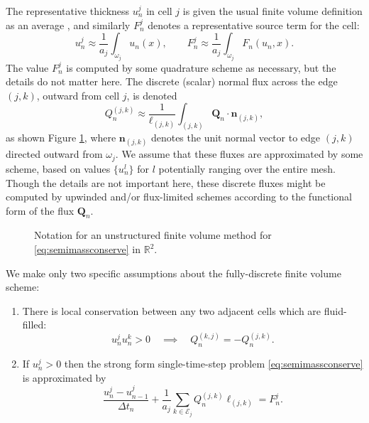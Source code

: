 \documentclass[final,leqno,onefignum,onetabnum]{siamltex1213bueler}
\newcommand\bn{\mathbf{n}}
\newcommand\bQ{\mathbf{Q}}
\newcommand\RR{\mathbb{R}}
\begin{document}
The representative thickness $u_n^j$ in cell $j$ is given the usual finite volume definition as an average \cite{LeVeque2002}, and similarly $F_n^j$ denotes a representative source term for the cell:
\begin{equation}
u_n^j \approx \frac{1}{a_j} \int_{\omega_j} u_n(x), \qquad F_n^j \approx \frac{1}{a_j} \int_{\omega_j} F_n(u_n,x).  \label{eq:fvthickness}
\end{equation}
The value $F_n^j$ is computed by some quadrature scheme as necessary, but the details do not matter here.  The discrete (scalar) normal flux across the edge $(j,k)$, outward from cell $j$, is denoted
\begin{equation}
Q_n^{(j,k)} \approx \frac{1}{\ell_{(j,k)}} \int_{(j,k)} \bQ_n \cdot \bn_{(j,k)}, \label{eq:fvflux}
\end{equation}
as shown Figure \ref{fig:fvmesh-notation}, where $\bn_{(j,k)}$ denotes the unit normal vector to edge $(j,k)$ directed outward from $\omega_j$.  We assume that these fluxes are approximated by some scheme, based on values $\{u_n^l\}$ for $l$ potentially ranging over the entire mesh.  Though the details are not important here, these discrete fluxes might be computed by upwinded and/or flux-limited schemes \cite{LeVeque2002} according to the functional form of the flux $\bQ_n$.

\begin{figure}[ht]
\begin{center}

\end{center}
\caption{Notation for an unstructured finite volume method for \eqref{eq:semimassconserve} in $\RR^2$.}
\label{fig:fvmesh-notation}
\end{figure}

We make only two specific assumptions about the fully-discrete finite volume scheme:
\renewcommand{\labelenumi}{(\roman{enumi})}
\begin{enumerate}
\item There is local conservation between any two adjacent cells which are fluid-filled:
\begin{equation}
  u_n^j u_n^k > 0 \quad \implies \quad Q_n^{(k,j)}=-Q_n^{(j,k)}.  \label{eq:fvlocalconservation}
\end{equation}
\item If $u_n^j>0$ then the strong form single-time-step problem \eqref{eq:semimassconserve} is approximated by
\begin{equation}
\frac{u_n^j - u_{n-1}^j}{\Delta t_n} + \frac{1}{a_j} \sum_{k\in \mathcal{E}_j} Q_n^{(j,k)} \ell_{(j,k)} = F_n^j. \label{eq:fvmassconserve}
\end{equation}
\end{enumerate}
\end{document}
